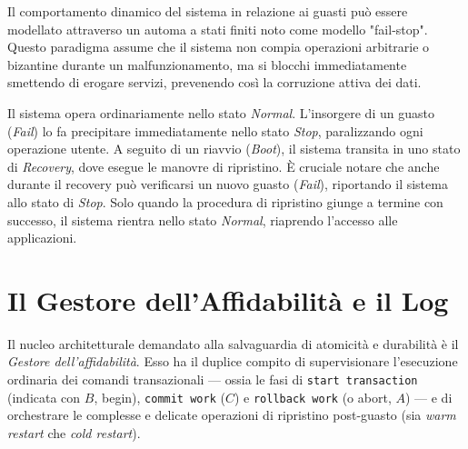 Il comportamento dinamico del sistema in relazione ai guasti può essere modellato attraverso un automa a stati finiti noto come modello "fail-stop". Questo paradigma assume che il sistema non compia operazioni arbitrarie o bizantine durante un malfunzionamento, ma si blocchi immediatamente smettendo di erogare servizi, prevenendo così la corruzione attiva dei dati.

\vspace{1em}
\begin{center}
\end{center}
\vspace{1em}

Il sistema opera ordinariamente nello stato \textit{Normal}. L'insorgere di un guasto (\textit{Fail}) lo fa precipitare immediatamente nello stato \textit{Stop}, paralizzando ogni operazione utente. A seguito di un riavvio (\textit{Boot}), il sistema transita in uno stato di \textit{Recovery}, dove esegue le manovre di ripristino. È cruciale notare che anche durante il recovery può verificarsi un nuovo guasto (\textit{Fail}), riportando il sistema allo stato di \textit{Stop}. Solo quando la procedura di ripristino giunge a termine con successo, il sistema rientra nello stato \textit{Normal}, riaprendo l'accesso alle applicazioni.

\section{Il Gestore dell'Affidabilità e il Log}

Il nucleo architetturale demandato alla salvaguardia di atomicità e durabilità è il \textit{Gestore dell'affidabilità}. Esso ha il duplice compito di supervisionare l'esecuzione ordinaria dei comandi transazionali — ossia le fasi di \texttt{start transaction} (indicata con $B$, begin), \texttt{commit work} ($C$) e \texttt{rollback work} (o abort, $A$) — e di orchestrare le complesse e delicate operazioni di ripristino post-guasto (sia \textit{warm restart} che \textit{cold restart}).

